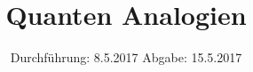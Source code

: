 

\subject{VERSUCH 23}
\title{Quanten Analogien}
\date{
  Durchführung: 8.5.2017
  \hspace{3em}
  Abgabe: 15.5.2017
}



\maketitle
\thispagestyle{empty}
\tableofcontents
\newpage


\clearpage
\newpage

\clearpage
\newpage

\clearpage
\newpage

\clearpage
\newpage

\clearpage
\newpage

\clearpage
\newpage

\printbibliography

\clearpage
\newpage





%
%
%     
%
